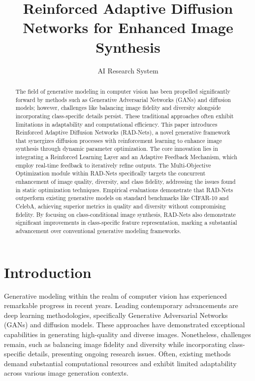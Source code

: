 \documentclass{article} %
\title{Reinforced Adaptive Diffusion Networks for Enhanced Image Synthesis}
\author{AI Research System}
\begin{document}
\maketitle

\begin{abstract}
The field of generative modeling in computer vision has been propelled significantly forward by methods such as Generative Adversarial Networks (GANs) and diffusion models; however, challenges like balancing image fidelity and diversity alongside incorporating class-specific details persist. These traditional approaches often exhibit limitations in adaptability and computational efficiency. This paper introduces Reinforced Adaptive Diffusion Networks (RAD-Nets), a novel generative framework that synergizes diffusion processes with reinforcement learning to enhance image synthesis through dynamic parameter optimization. The core innovation lies in integrating a Reinforced Learning Layer and an Adaptive Feedback Mechanism, which employ real-time feedback to iteratively refine outputs. The Multi-Objective Optimization module within RAD-Nets specifically targets the concurrent enhancement of image quality, diversity, and class fidelity, addressing the issues found in static optimization techniques. Empirical evaluations demonstrate that RAD-Nets outperform existing generative models on standard benchmarks like CIFAR-10 and CelebA, achieving superior metrics in quality and diversity without compromising fidelity. By focusing on class-conditional image synthesis, RAD-Nets also demonstrate significant improvements in class-specific feature representation, marking a substantial advancement over conventional generative modeling frameworks.
\end{abstract}


\section{Introduction}

Generative modeling within the realm of computer vision has experienced remarkable progress in recent years. Leading contemporary advancements are deep learning methodologies, specifically Generative Adversarial Networks (GANs) and diffusion models. These approaches have demonstrated exceptional capabilities in generating high-quality and diverse images. Nonetheless, challenges remain, such as balancing image fidelity and diversity while incorporating class-specific details, presenting ongoing research issues. Often, existing methods demand substantial computational resources and exhibit limited adaptability across various image generation contexts.
\end{document}
